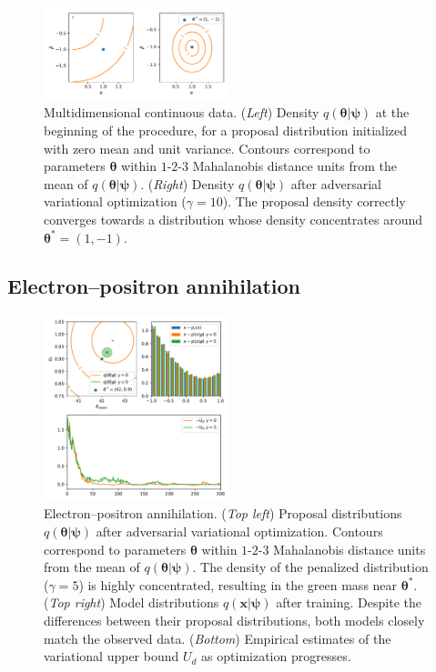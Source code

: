 \documentclass[twocolumn,superscriptaddress,aps]{revtex4-1}
\newcommand{\qxpsi}{q(\mathbf{x}|\bfpsi)}
\newcommand{\bftheta}{{\bm \theta}}
\newcommand{\bfpsi}{{\bm \psi}}
\theoremstyle{plain}
\begin{document}
\begin{figure}
    \centering
    \includegraphics[width=0.48\textwidth]{figures/multi.pdf}
    \caption{Multidimensional continuous data.
             ({\it Left}) Density $q(\bftheta|\bfpsi)$ at the beginning of the procedure, for a proposal distribution initialized with zero mean and unit variance.
                          Contours correspond to parameters $\bftheta$ within $1$-$2$-$3$ Mahalanobis distance units from the mean of $q(\bftheta|\bfpsi)$.
             ({\it Right}) Density $q(\bftheta|\bfpsi)$ after adversarial variational optimization ($\gamma=10$).
                           The proposal density correctly converges towards a distribution whose density concentrates around $\bftheta^* = (1, -1)$.
             }\label{fig:multi}
\end{figure}


\subsection{Electron--positron annihilation}

\begin{figure}
    \centering
    \includegraphics[width=0.48\textwidth]{figures/weinberg.pdf}
    \caption{Electron--positron annihilation.
    ({\it Top left}) Proposal distributions $q(\bftheta|\bfpsi)$ after adversarial variational optimization.
                     Contours correspond to parameters $\bftheta$ within $1$-$2$-$3$ Mahalanobis distance units from the mean of $q(\bftheta|\bfpsi)$.
                     The density of the penalized distribution ($\gamma=5$) is  highly concentrated, resulting in the green mass near $\bftheta^*$.
    ({\it Top right}) Model distributions $\qxpsi$ after training. Despite the differences between their proposal distributions, both models closely match the observed data.
    ({\it Bottom}) Empirical estimates of the variational upper bound $U_d$ as optimization progresses.
             }\label{fig:weinberg}
\end{figure}
\end{document}
